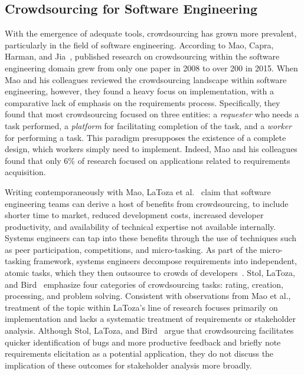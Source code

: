 \subsection{Crowdsourcing for Software Engineering}
\label{crowd_in_se}

With the emergence of adequate tools, crowdsourcing has grown more prevalent, particularly in the field of software engineering. According to Mao, Capra, Harman, and Jia~\cite{mao}, published research on crowdsourcing within the software engineering domain grew from only one paper in 2008 to over 200 in 2015. When Mao and his colleagues reviewed the crowdsourcing landscape within software engineering, however, they found a heavy focus on implementation, with a comparative lack of emphasis on the requirements process. Specifically, they found that most crowdsourcing focused on three entities: a \emph{requester} who needs a task performed, a \emph{platform} for facilitating completion of the task, and a \emph{worker} for performing a task. This paradigm presupposes the existence of a complete design, which workers simply need to implement. Indeed, Mao and his colleagues found that only 6\% of research focused on applications related to requirements acquisition.

Writing contemporaneously with Mao, LaToza et al.~\cite{latoza2} claim that software engineering teams can derive a host of benefits from crowdsourcing, to include shorter time to market, reduced development costs, increased developer productivity, and availability of technical expertise not available internally. Systems engineers can tap into these benefits through the use of techniques such as peer participation, competitions, and micro-tasking. As part of the micro-tasking framework, systems engineers decompose requirements into independent, atomic tasks, which they then outsource to crowds of developers~\cite{latoza}. Stol, LaToza, and Bird~\cite{stol} emphasize four categories of crowdsourcing tasks: rating, creation, processing, and problem solving. Consistent with observations from Mao et al., treatment of the topic within LaToza's line of research focuses primarily on implementation and lacks a systematic treatment of requirements or stakeholder analysis. Although Stol, LaToza, and Bird~\cite{stol} argue that crowdsourcing facilitates quicker identification of bugs and more productive feedback and briefly note requirements elicitation as a potential application, they do not discuss the implication of these outcomes for stakeholder analysis more broadly.


